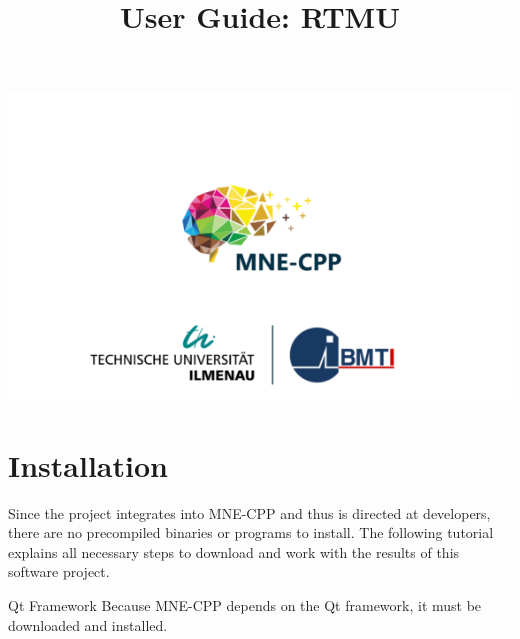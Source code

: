 



	
\title{User Guide: RTMU}
\vspace{3 in}
\maketitle

\includegraphics[width = \linewidth]{figures/mne-cpp.png}

\clearpage


\tableofcontents

\clearpage


\section{Installation}

Since the project integrates into MNE-CPP and thus is directed at developers, there are no precompiled binaries or programs to install. The following tutorial explains all necessary steps to download and work with the results of this software project.

\begin{aims}
	\item[\hspace*{11mm} Qt Framework] Because MNE-CPP depends on the Qt framework, it must be downloaded and installed.
\end{aims}

